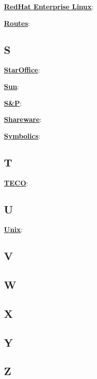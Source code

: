 \underline{\textbf{RedHat Enterprise Linux}}: %

\underline{\textbf{Routes}}: %



\subsection*{S}

\underline{\textbf{StarOffice}}: %

\underline{\textbf{Sun}}: 

\underline{\textbf{S\&P}}: %

\underline{\textbf{Shareware}}: %

\underline{\textbf{Symbolics}}: %

\subsection*{T}

\underline{\textbf{TECO}}: %

\subsection*{U}

\underline{\textbf{Unix}}: %

\subsection*{V}

\subsection*{W}

\subsection*{X}

\subsection*{Y}

\subsection*{Z}


	



